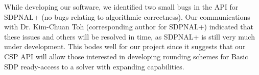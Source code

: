 \documentclass[12pt]{article} %
\begin{document}
While developing our software, we identified two small bugs in the API for SDPNAL+ (no bugs relating to algorithmic correctness). Our communications with Dr. Kim-Chuan Toh (corresponding author for SDPNAL+) indicated that these issues and others will be resolved in time, as SDPNAL+ is still very much under development. This bodes well for our project since it suggests that our CSP API will allow those interested in developing rounding schemes for Basic SDP ready-access to a solver with expanding capabilities.


\renewcommand{\bibname}{References}


\end{document}
